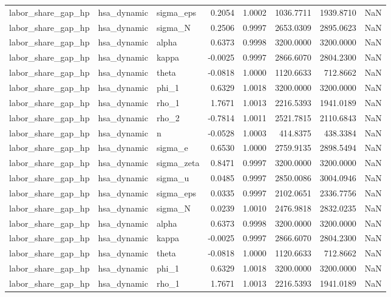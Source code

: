 \begin{tabular}{lllrrrrl}
labor\_share\_gap\_hp & hsa\_dynamic & sigma\_eps & 0.2054 & 1.0002 & 1036.7711 & 1939.8710 & NaN \\
labor\_share\_gap\_hp & hsa\_dynamic & sigma\_N & 0.2506 & 0.9997 & 2653.0309 & 2895.0623 & NaN \\
labor\_share\_gap\_hp & hsa\_dynamic & alpha & 0.6373 & 0.9998 & 3200.0000 & 3200.0000 & NaN \\
labor\_share\_gap\_hp & hsa\_dynamic & kappa & -0.0025 & 0.9997 & 2866.6070 & 2804.2300 & NaN \\
labor\_share\_gap\_hp & hsa\_dynamic & theta & -0.0818 & 1.0000 & 1120.6633 & 712.8662 & NaN \\
labor\_share\_gap\_hp & hsa\_dynamic & phi\_1 & 0.6329 & 1.0018 & 3200.0000 & 3200.0000 & NaN \\
labor\_share\_gap\_hp & hsa\_dynamic & rho\_1 & 1.7671 & 1.0013 & 2216.5393 & 1941.0189 & NaN \\
labor\_share\_gap\_hp & hsa\_dynamic & rho\_2 & -0.7814 & 1.0011 & 2521.7815 & 2110.6843 & NaN \\
labor\_share\_gap\_hp & hsa\_dynamic & n & -0.0528 & 1.0003 & 414.8375 & 438.3384 & NaN \\
labor\_share\_gap\_hp & hsa\_dynamic & sigma\_e & 0.6530 & 1.0000 & 2759.9135 & 2898.5494 & NaN \\
labor\_share\_gap\_hp & hsa\_dynamic & sigma\_zeta & 0.8471 & 0.9997 & 3200.0000 & 3200.0000 & NaN \\
labor\_share\_gap\_hp & hsa\_dynamic & sigma\_u & 0.0485 & 0.9997 & 2850.0086 & 3004.0946 & NaN \\
labor\_share\_gap\_hp & hsa\_dynamic & sigma\_eps & 0.0335 & 0.9997 & 2102.0651 & 2336.7756 & NaN \\
labor\_share\_gap\_hp & hsa\_dynamic & sigma\_N & 0.0239 & 1.0010 & 2476.9818 & 2832.0235 & NaN \\
labor\_share\_gap\_hp & hsa\_dynamic & alpha & 0.6373 & 0.9998 & 3200.0000 & 3200.0000 & NaN \\
labor\_share\_gap\_hp & hsa\_dynamic & kappa & -0.0025 & 0.9997 & 2866.6070 & 2804.2300 & NaN \\
labor\_share\_gap\_hp & hsa\_dynamic & theta & -0.0818 & 1.0000 & 1120.6633 & 712.8662 & NaN \\
labor\_share\_gap\_hp & hsa\_dynamic & phi\_1 & 0.6329 & 1.0018 & 3200.0000 & 3200.0000 & NaN \\
labor\_share\_gap\_hp & hsa\_dynamic & rho\_1 & 1.7671 & 1.0013 & 2216.5393 & 1941.0189 & NaN \\

\end{tabular}
